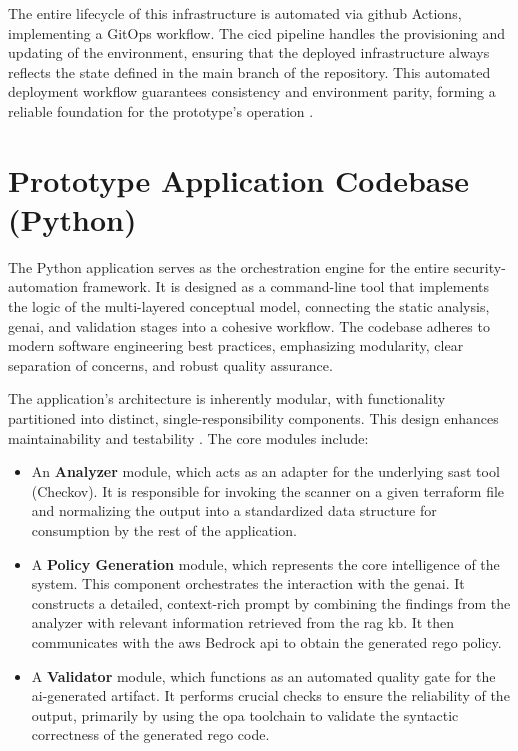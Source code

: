 The entire lifecycle of this infrastructure is automated via \gls{github} Actions, implementing a GitOps workflow. The \gls{cicd} pipeline handles the provisioning and updating of the environment, ensuring that the deployed infrastructure always reflects the state defined in the main branch of the repository. This automated deployment workflow guarantees consistency and environment parity, forming a reliable foundation for the prototype's operation \cite{noauthor_gitops_nodate}.

\section{Prototype Application Codebase (Python)}

The Python application serves as the \gls{orchestration} engine for the entire \gls{security-automation} framework. It is designed as a command-line tool that implements the logic of the multi-layered conceptual model, connecting the static analysis, \gls{genai}, and validation stages into a cohesive workflow. The codebase adheres to modern software engineering best practices, emphasizing modularity, clear separation of concerns, and robust quality assurance.

The application's architecture is inherently modular, with functionality partitioned into distinct, single-responsibility components. This design enhances maintainability and testability \cite{martin_clean_2009}. The core modules include:

\begin{itemize}
    \item An \textbf{Analyzer} module, which acts as an adapter for the underlying \gls{sast} tool (Checkov). It is responsible for invoking the scanner on a given \gls{terraform} file and normalizing the output into a standardized data structure for consumption by the rest of the application.
    \item A \textbf{Policy Generation} module, which represents the core intelligence of the system. This component orchestrates the interaction with the \gls{genai}. It constructs a detailed, context-rich prompt by combining the findings from the analyzer with relevant information retrieved from the \gls{rag} \gls{kb}. It then communicates with the \gls{aws} Bedrock \gls{api} to obtain the generated \gls{rego} policy.
    \item A \textbf{Validator} module, which functions as an automated quality gate for the \gls{ai}-generated artifact. It performs crucial checks to ensure the reliability of the output, primarily by using the \gls{opa} toolchain to validate the syntactic correctness of the generated \gls{rego} code.
\end{itemize}


